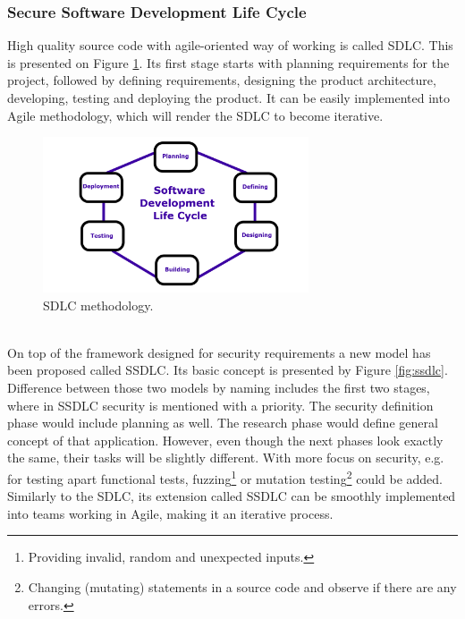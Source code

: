 \documentclass{article} %
\begin{document}
\subsubsection{Secure Software Development Life Cycle}
High quality source code with agile-oriented way of working is called SDLC. This is presented on Figure \ref{fig:sdlc}. Its first stage starts with planning requirements for the project, followed by defining requirements, designing the product architecture, developing, testing and deploying the product. It can be easily implemented into Agile methodology, which will render the SDLC to become iterative.
\begin{figure}[ht]
  \centering
      \includegraphics[width=0.7\textwidth]{sdlc.png}
  \caption{SDLC methodology.}
  \label{fig:sdlc}
\end{figure}\\
\newline
On top of the framework designed for security requirements a new model has been proposed called SSDLC. Its basic concept is presented by Figure \ref{fig:ssdlc}. Difference between those two models by naming includes the first two stages, where in SSDLC security is mentioned with a priority. The security definition phase would include planning as well. The research phase would define general concept of that application. However, even though the next phases look exactly the same, their tasks will be slightly different. With more focus on security, e.g. for testing apart functional tests, fuzzing\footnote{Providing invalid, random and unexpected inputs.} or mutation testing\footnote{Changing (mutating) statements in a source code and observe if there are any errors.} could be added. Similarly to the SDLC, its extension called SSDLC can be smoothly implemented into teams working in Agile, making it an iterative process.
\end{document}
